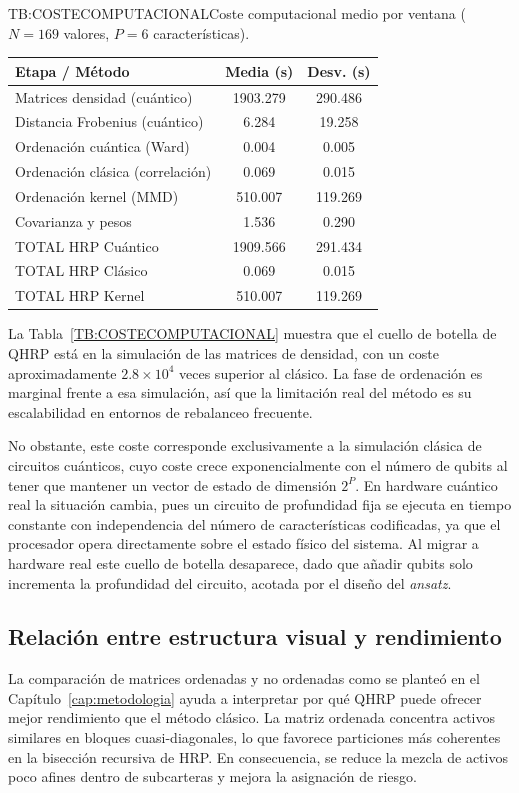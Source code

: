 \begin{table}[Coste computacional]{TB:COSTECOMPUTACIONAL}{Coste computacional medio por ventana (\(N=169\) valores, \(P=6\) características).}
\begin{tabular}{lcc}
\hline
\textbf{Etapa / Método} & \textbf{Media (s)} & \textbf{Desv. (s)} \\
\hline
Matrices densidad (cuántico) & 1903.279 & 290.486 \\
Distancia Frobenius (cuántico) & 6.284 & 19.258 \\
Ordenación cuántica (Ward) & 0.004 & 0.005 \\
Ordenación clásica (correlación) & 0.069 & 0.015 \\
Ordenación kernel (MMD) & 510.007 & 119.269 \\
Covarianza y pesos & 1.536 & 0.290 \\
\hline
TOTAL HRP Cuántico & 1909.566 & 291.434 \\
TOTAL HRP Clásico & 0.069 & 0.015 \\
TOTAL HRP Kernel & 510.007 & 119.269 \\
\hline
\end{tabular}
\end{table}

La Tabla~\ref{TB:COSTECOMPUTACIONAL} muestra que el cuello de botella de \gls{QHRP} está en la simulación de las matrices de densidad, con un coste aproximadamente $2.8\times 10^4$ veces superior al clásico. La fase de ordenación es marginal frente a esa simulación, así que la limitación real del método es su escalabilidad en entornos de rebalanceo frecuente.

No obstante, este coste corresponde exclusivamente a la simulación clásica de circuitos cuánticos, cuyo coste crece exponencialmente con el número de qubits al tener que mantener un vector de estado de dimensión $2^P$. En hardware cuántico real la situación cambia, pues un circuito de profundidad fija se ejecuta en tiempo constante con independencia del número de características codificadas, ya que el procesador opera directamente sobre el estado físico del sistema. Al migrar a hardware real este cuello de botella desaparece, dado que añadir qubits solo incrementa la profundidad del circuito, acotada por el diseño del \textit{ansatz}.

\subsection{Relación entre estructura visual y rendimiento}
La comparación de matrices ordenadas y no ordenadas como se planteó en el Capítulo~\ref{cap:metodologia} ayuda a interpretar por qué \gls{QHRP} puede ofrecer mejor rendimiento que el método clásico. La matriz ordenada concentra activos similares en bloques cuasi-diagonales, lo que favorece particiones más coherentes en la bisección recursiva de \gls{HRP}. En consecuencia, se reduce la mezcla de activos poco afines dentro de subcarteras y mejora la asignación de riesgo.

